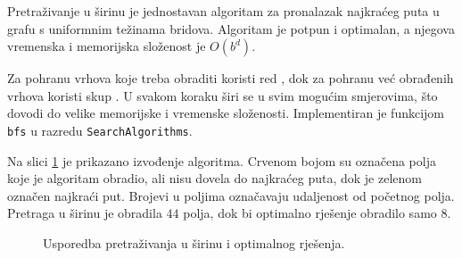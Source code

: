 Pretraživanje u širinu  je jednostavan algoritam za pronalazak najkraćeg puta u grafu s uniformnim težinama bridova.
Algoritam je potpun i optimalan, a njegova vremenska i memorijska složenost je \( O(b^d) \).

Za pohranu vrhova koje treba obraditi koristi red , dok za pohranu već obrađenih vrhova koristi skup .
U svakom koraku širi se u svim mogućim smjerovima, što dovodi do velike memorijske i vremenske složenosti.
Implementiran je funkcijom \texttt{bfs} u razredu \texttt{SearchAlgorithms}.

Na slici \ref{inefficient_bfs} je prikazano izvođenje algoritma.
Crvenom bojom su označena polja koje je algoritam obradio, ali nisu dovela do najkraćeg puta, dok je zelenom označen najkraći put.
Brojevi u poljima označavaju udaljenost od početnog polja.
Pretraga u širinu je obradila \( 44 \) polja, dok bi optimalno rješenje obradilo samo \( 8 \). 

\begin{figure}[h]
	\centering
	
	\caption{Usporedba pretraživanja u širinu i optimalnog rješenja.} 
	\label{inefficient_bfs}
\end{figure}

